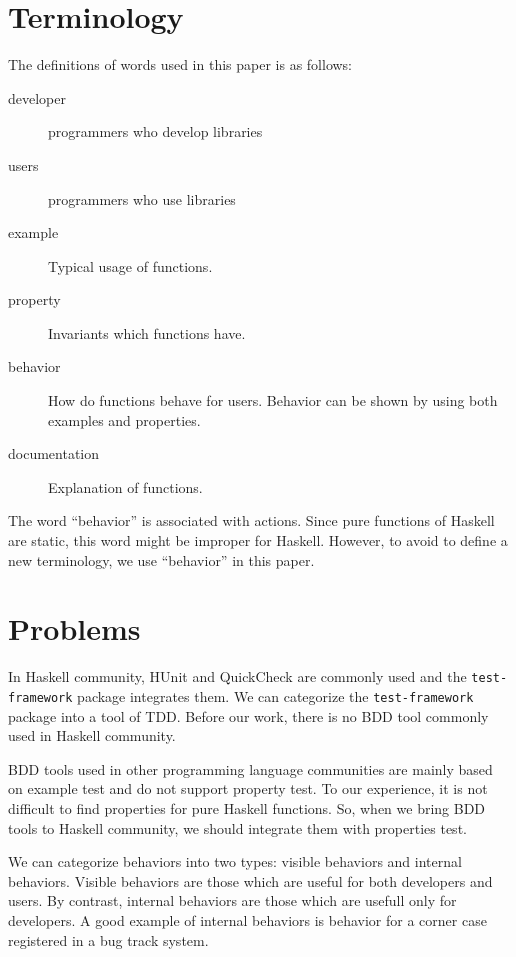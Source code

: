 \documentclass[preprint]{sigplanconf}
\begin{document}
\section{Terminology}

The definitions of words used in this paper is as follows:

\begin{description}
\item[developer] programmers who develop libraries
\item[users] programmers who use libraries
\item[example] Typical usage of functions.
\item[property] Invariants which functions have.
\item[behavior] How do functions behave for users. Behavior can be shown by using both examples and properties.
\item[documentation] Explanation of functions.
\end{description}

The word ``behavior'' is associated with actions.
Since pure functions of Haskell are static,
this word might be improper for Haskell.
However, to avoid to define a new terminology,
we use ``behavior'' in this paper.

\section{Problems}

In Haskell community, HUnit and QuickCheck are commonly used %
and the {\tt test-framework} package integrates them.
We can categorize the {\tt test-framework} package into
a tool of TDD.
Before our work, there is no BDD tool commonly used in Haskell community.

BDD tools used in other programming language communities are
mainly based on example test
and do not support property test.
To our experience, it is not difficult to find properties for
pure Haskell functions.
So, when we bring BDD tools to
Haskell community, we should integrate them with properties test.

We can categorize behaviors into two types: visible behaviors
and internal behaviors.
Visible behaviors are those which are useful for both developers and users.
By contrast, internal behaviors are those which are usefull only for developers.
A good example of internal behaviors
is behavior for a corner case registered in a bug track system.
\end{document}
